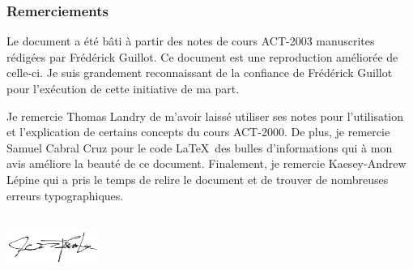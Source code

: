 
\subsubsection*{Remerciements}
Le document a été bâti à partir des notes de cours ACT-2003 manuscrites rédigées par Frédérick Guillot. Ce document est une reproduction améliorée de celle-ci. Je suis grandement reconnaissant de la confiance de Frédérick Guillot pour l'exécution de cette initiative de ma part. 
\bigskip

Je remercie Thomas Landry de m'avoir laissé utiliser ses notes pour l'utilisation et l'explication de certains concepts du cours ACT-2000. De plus, je remercie Samuel Cabral Cruz pour le code \LaTeX \  des bulles d'informations qui à mon avis améliore la beauté de ce document. Finalement, je remercie Kaesey-Andrew Lépine qui a pris le temps de relire le document et de trouver de nombreuses erreurs typographiques.

\bigskip
\includegraphics[height=2cm, width = 3cm]{fig/signature.png}

